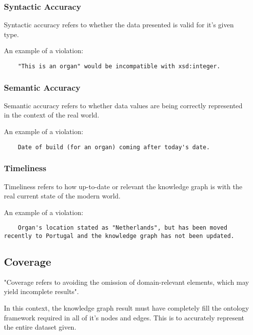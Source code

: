 \subsubsection{Syntactic Accuracy}
\hspace{0.5cm} Syntactic accuracy refers to whether the data presented is valid for it's given type. \cite{knowledgegraphevaulationbook}

An example of a violation: 
\begin{lstlisting}
    "This is an organ" would be incompatible with xsd:integer.
\end{lstlisting}

\subsubsection{Semantic Accuracy}
\hspace{0.5cm} Semantic accuracy refers to whether data values are being correctly represented in the context of the real world. \cite{knowledgegraphevaulationbook}

An example of a violation: 
\begin{lstlisting}
    Date of build (for an organ) coming after today's date. 
\end{lstlisting}

\subsubsection{Timeliness}
\hspace{0.5cm} Timeliness refers to how up-to-date or relevant the knowledge graph is with the real current state of the modern world. \cite{knowledgegraphevaulationbook}

An example of a violation: 
\begin{lstlisting}
    Organ's location stated as "Netherlands", but has been moved recently to Portugal and the knowledge graph has not been updated.
\end{lstlisting}

\subsection{Coverage}
\hspace{0.5cm} "Coverage refers to avoiding the omission of domain-relevant elements, which may yield incomplete results". \cite{knowledgegraphevaulationbook}

In this context, the knowledge graph result must have completely fill the ontology framework required in all of it's nodes and edges. This is to accurately represent the entire dataset given. 


